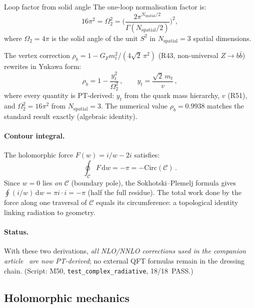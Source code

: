 \documentclass[12pt,a4paper]{article}
\begin{document}
\begin{derbox}{Loop factor from solid angle}
\label{der:loop_factor}
The one-loop normalisation factor is:
\begin{equation}
  16\pi^2 = \Omega_2^2 = \biggl(
  \frac{2\pi^{N_{\mathrm{spatial}}/2}}{\Gamma(N_{\mathrm{spatial}}/2)}
  \biggr)^{\!2},
  \label{eq:loop_factor}
\end{equation}
where $\Omega_2 = 4\pi$ is the solid angle of the unit $S^2$ in
$N_{\mathrm{spatial}} = 3$ spatial dimensions.
\end{derbox}

The vertex correction $\rho_b = 1 - G_F m_t^2/(4\sqrt{2}\,\pi^2)$
(R43, non-universal $Z\to b\bar{b}$) rewrites in Yukawa form:
\begin{equation}
  \rho_b = 1 - \frac{y_t^2}{\Omega_2^2}\,,
  \qquad y_t = \frac{\sqrt{2}\,m_t}{v}\,,
  \label{eq:rho_b_pt}
\end{equation}
where every quantity is PT-derived: $y_t$ from the quark mass hierarchy,
$v$ (R51), and $\Omega_2^2 = 16\pi^2$ from $N_{\mathrm{spatial}} = 3$.
The numerical value $\rho_b = 0.9938$ matches the standard
result exactly (algebraic identity).

\paragraph{Contour integral.}
The holomorphic force $F(w) = i/w - 2i$ satisfies:
\begin{equation}
  \oint_{\mathcal{C}} F\,\mathrm{d}w = -\pi = -\mathrm{Circ}(\mathcal{C})\,.
  \label{eq:contour_F}
\end{equation}
Since $w = 0$ lies \emph{on} $\mathcal{C}$ (boundary pole),
the Sokhotski--Plemelj formula gives
$\oint(i/w)\,\mathrm{d}w = \pi i \cdot i = -\pi$ (half the full residue).
The total work done by the force along one traversal of $\mathcal{C}$
equals its circumference: a topological identity linking radiation
to geometry.

\paragraph{Status.}
With these two derivations,
\emph{all NLO/NNLO corrections used in the companion
article}~\cite{companion_physics} \emph{are now PT-derived};
no external QFT formulas remain in the dressing chain.
(Script: M50, \texttt{test\_complex\_radiative}, 18/18~PASS.)


\subsection{Holomorphic mechanics}
\label{sec:cx_force}
\end{document}
